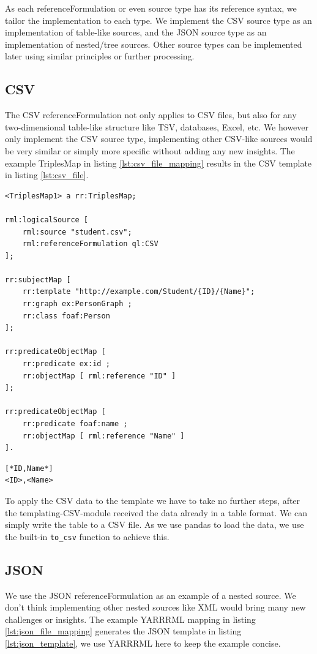 As each referenceFormulation or even source type has its reference syntax, we tailor the implementation to each type. We implement the CSV source type as an implementation of table-like sources, and the JSON source type as an implementation of nested/tree sources. Other source types can be implemented later using similar principles or further processing.

\subsection{CSV}
\label{subsection:csv}
The CSV referenceFormulation not only applies to CSV files, but also for any two-dimensional table-like structure like TSV, databases, Excel, etc. We however only implement the CSV source type, implementing other CSV-like sources would be very similar or simply more specific without adding any new insights. The example TriplesMap in listing \ref{lst:csv_file_mapping} results in the CSV template in listing \ref{lst:csv_file}.

\begin{lstlisting}[caption={Example mapping for a CSV file}, label={lst:csv_file_mapping}, captionpos=b, basicstyle=\small, frame=single]
<TriplesMap1> a rr:TriplesMap;

rml:logicalSource [
    rml:source "student.csv";
    rml:referenceFormulation ql:CSV
];

rr:subjectMap [ 
    rr:template "http://example.com/Student/{ID}/{Name}";
    rr:graph ex:PersonGraph ;
    rr:class foaf:Person
];

rr:predicateObjectMap [ 
    rr:predicate ex:id ; 
    rr:objectMap [ rml:reference "ID" ]
];

rr:predicateObjectMap [ 
    rr:predicate foaf:name ; 
    rr:objectMap [ rml:reference "Name" ]
].
\end{lstlisting}

\begin{lstlisting}[caption={Example CSV template}, label={lst:csv_file}, captionpos=b, basicstyle=\small, frame=single]
[*ID,Name*]
<ID>,<Name>
\end{lstlisting}

To apply the CSV data to the template we have to take no further steps, after the templating-CSV-module received the data already in a table format. We can simply write the table to a CSV file. As we use pandas to load the data, we use the built-in \texttt{to\_csv} function to achieve this. 

\subsection{JSON}
\label{subsection:json}
We use the JSON referenceFormulation as an example of a nested source. We don't think implementing other nested sources like XML would bring many new challenges or insights. 
The example YARRRML mapping in listing \ref{lst:json_file_mapping} generates the JSON template in listing \ref{lst:json_template}, we use YARRRML here to keep the example concise.

